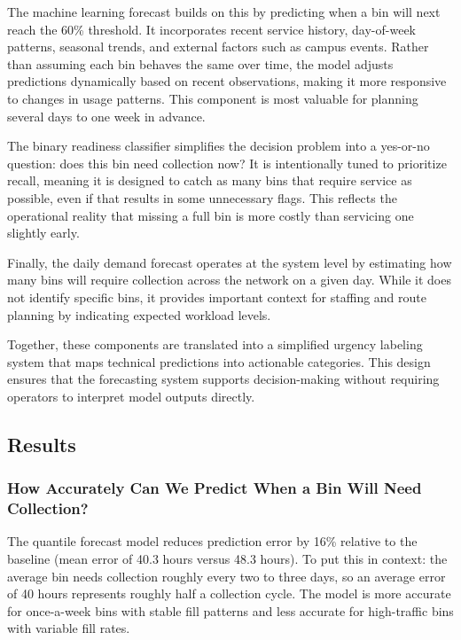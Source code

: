 \documentclass[11pt]{article}
\begin{document}
The machine learning forecast builds on this by predicting when a bin will next reach the 60\% threshold. It incorporates recent service history, day-of-week patterns, seasonal trends, and external factors such as campus events. Rather than assuming each bin behaves the same over time, the model adjusts predictions dynamically based on recent observations, making it more responsive to changes in usage patterns. This component is most valuable for planning several days to one week in advance.

The binary readiness classifier simplifies the decision problem into a yes-or-no question: does this bin need collection now? It is intentionally tuned to prioritize recall, meaning it is designed to catch as many bins that require service as possible, even if that results in some unnecessary flags. This reflects the operational reality that missing a full bin is more costly than servicing one slightly early.

Finally, the daily demand forecast operates at the system level by estimating how many bins will require collection across the network on a given day. While it does not identify specific bins, it provides important context for staffing and route planning by indicating expected workload levels.

Together, these components are translated into a simplified urgency labeling system that maps technical predictions into actionable categories. This design ensures that the forecasting system supports decision-making without requiring operators to interpret model outputs directly.

\subsection{Results}

\subsubsection*{How Accurately Can We Predict When a Bin Will Need Collection?}

The quantile forecast model reduces prediction error by 16\% relative to the baseline
(mean error of 40.3 hours versus 48.3 hours). To put this in context: the average bin
needs collection roughly every two to three days, so an average error of 40 hours
represents roughly half a collection cycle. The model is more accurate for once-a-week
bins with stable fill patterns and less accurate for high-traffic bins with variable fill
rates.
\end{document}
